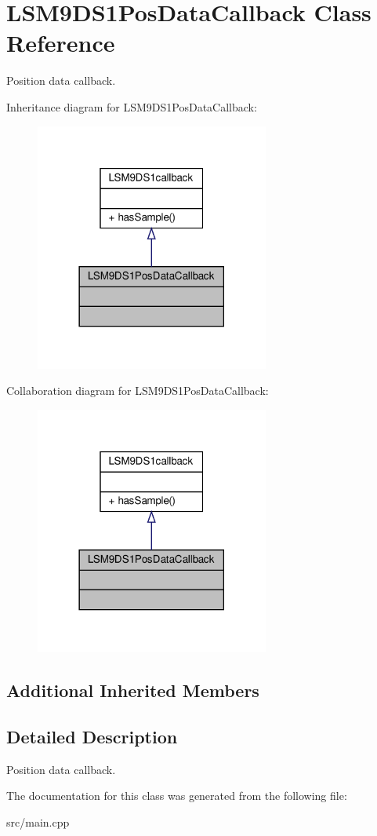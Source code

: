 \hypertarget{classLSM9DS1PosDataCallback}{}\section{L\+S\+M9\+D\+S1\+Pos\+Data\+Callback Class Reference}
\label{classLSM9DS1PosDataCallback}


Position data callback.  




Inheritance diagram for L\+S\+M9\+D\+S1\+Pos\+Data\+Callback\+:\nopagebreak
\begin{figure}[H]
\begin{center}
\leavevmode
\includegraphics[width=218pt]{classLSM9DS1PosDataCallback__inherit__graph}
\end{center}
\end{figure}


Collaboration diagram for L\+S\+M9\+D\+S1\+Pos\+Data\+Callback\+:\nopagebreak
\begin{figure}[H]
\begin{center}
\leavevmode
\includegraphics[width=218pt]{classLSM9DS1PosDataCallback__coll__graph}
\end{center}
\end{figure}
\subsection*{Additional Inherited Members}


\subsection{Detailed Description}
Position data callback. 

The documentation for this class was generated from the following file\+:\begin{DoxyCompactItemize}
\item 
src/main.\+cpp\end{DoxyCompactItemize}
